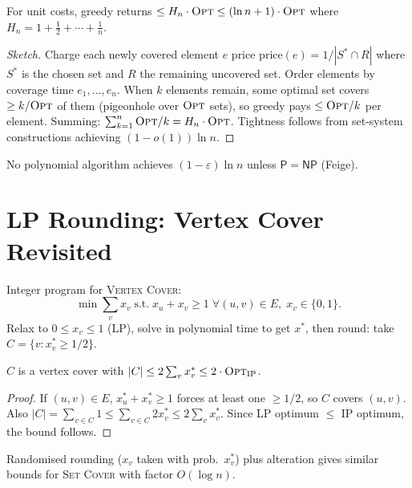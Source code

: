 \begin{theorem}
For unit costs, greedy returns $\le H_n\cdot\textsc{Opt}\le(\ln n+1)\cdot\textsc{Opt}$ where $H_n=1+\tfrac12+\cdots+\tfrac1n$.
\end{theorem}
\begin{proof}[Sketch]
Charge each newly covered element $e$ price $\text{price}(e)=1/|S^*\cap R|$ where $S^*$ is the chosen set and $R$ the remaining uncovered set. Order elements by coverage time $e_1,\dots,e_n$. When $k$ elements remain, some optimal set covers $\ge k/\textsc{Opt}$ of them (pigeonhole over $\textsc{Opt}$ sets), so greedy pays $\le\textsc{Opt}/k$ per element. Summing: $\sum_{k=1}^{n}\textsc{Opt}/k=H_n\cdot\textsc{Opt}$. Tightness follows from set-system constructions achieving $(1-o(1))\ln n$.
\end{proof}

No polynomial algorithm achieves $(1-\varepsilon)\ln n$ unless $\mathsf{P}=\mathsf{NP}$ (Feige).

\section{LP Rounding: Vertex Cover Revisited}
\label{sec:lp-rounding}

Integer program for \textsc{Vertex Cover}:
\[
\min\sum_{v}x_v \;\text{s.t.}\; x_u+x_v\ge 1\;\forall (u,v)\in E,\; x_v\in\{0,1\}.
\]
Relax to $0\le x_v\le 1$ (LP), solve in polynomial time to get $x^*$, then round: take $C=\{v:x^*_v\ge 1/2\}$.

\begin{theorem}
$C$ is a vertex cover with $|C|\le 2\sum_v x^*_v\le 2\cdot\textsc{Opt}_{\text{IP}}$.
\end{theorem}
\begin{proof}
If $(u,v)\in E$, $x^*_u+x^*_v\ge 1$ forces at least one $\ge 1/2$, so $C$ covers $(u,v)$. Also $|C|=\sum_{v\in C}1\le\sum_{v\in C}2x^*_v\le2\sum_v x^*_v$. Since LP optimum $\le$ IP optimum, the bound follows.
\end{proof}
Randomised rounding ($x_v$ taken with prob.\ $x^*_v$) plus alteration gives similar bounds for \textsc{Set Cover} with factor $O(\log n)$.

